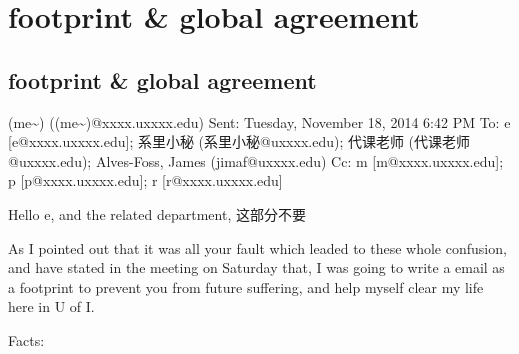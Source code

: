 \documentclass[12pt]{book}
\begin{document}
\chapter{footprint \& global agreement}
\label{sec-29}
\section{footprint \& global agreement}
\label{sec-29-1}
(me\textasciitilde{}) ((me\textasciitilde{})@xxxx.uxxxx.edu)
Sent:        Tuesday, November 18, 2014 6:42 PM
To:        
e [e@xxxx.uxxxx.edu]; 系里小秘 (系里小秘@uxxxx.edu); 代课老师 (代课老师@uxxxx.edu); Alves-Foss, James (jimaf@uxxxx.edu)
Cc:        
m [m@xxxx.uxxxx.edu]; p [p@xxxx.uxxxx.edu]; r [r@xxxx.uxxxx.edu]

Hello e, and the related department, 这部分不要

As I pointed out that it was all your fault which leaded to these whole confusion, and have stated in the meeting on Saturday that, I was going to write a email as a footprint to prevent you from future suffering, and help myself clear my life here in U of I. 

Facts:
\end{document}

